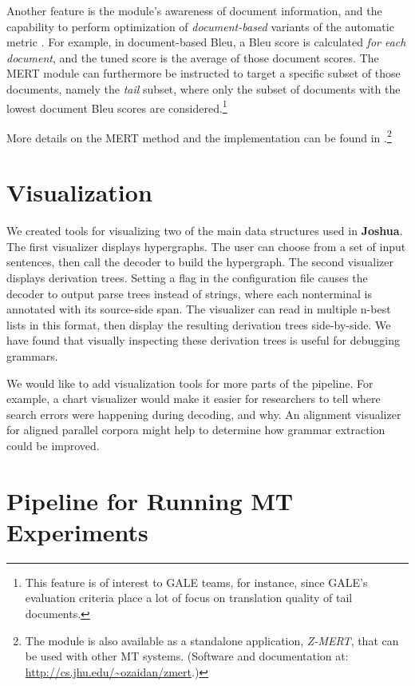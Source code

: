\documentclass[11pt]{article}
\newcommand{\joshua}{\textbf{Joshua}\xspace}
\begin{document}
Another feature is the module's awareness of document information, and the
capability to perform optimization of {\em document-based} variants of the
automatic metric \cite{atypical-mert}. For example, in document-based Bleu,
a Bleu score is calculated {\em for each document}, and the tuned score is the
average of those document scores. The MERT module can furthermore be instructed
to target a specific subset of those documents, namely the {\em tail} subset,
where only the subset of documents with the lowest document Bleu scores are
considered.\footnote{This feature is of interest to GALE teams, for instance,
since GALE's evaluation criteria place a lot of focus on translation quality of
tail documents.}

More details on the MERT method and the
implementation can be found in .\footnote{The module
is also available as a standalone application, {\em Z-MERT}, that can be used
with other MT systems. (Software and documentation at: \url{http://cs.jhu.edu/~ozaidan/zmert}.)}

\section{Visualization}

We created tools for visualizing two of the main data structures used
in \joshua \cite{PBML-2010-Joshua-visualization}. The first visualizer displays hypergraphs. The user can choose from
a set of input sentences, then call the decoder to build the hypergraph.
The second  visualizer displays derivation trees. Setting a flag in the configuration file causes the decoder to output parse trees instead of strings, where each nonterminal is annotated with its source-side
span. The visualizer can read in multiple n-best lists in this format, then
display the resulting derivation trees side-by-side. We have found that
visually inspecting these derivation trees is useful for debugging
grammars.

We would like to add visualization tools for more parts of the pipeline. For
example, a chart visualizer would make it easier for researchers to tell where
search errors were happening during decoding, and why. An alignment visualizer
for aligned parallel corpora might help to determine how grammar extraction 
could be improved.


\section{Pipeline for Running MT Experiments}
\end{document}
